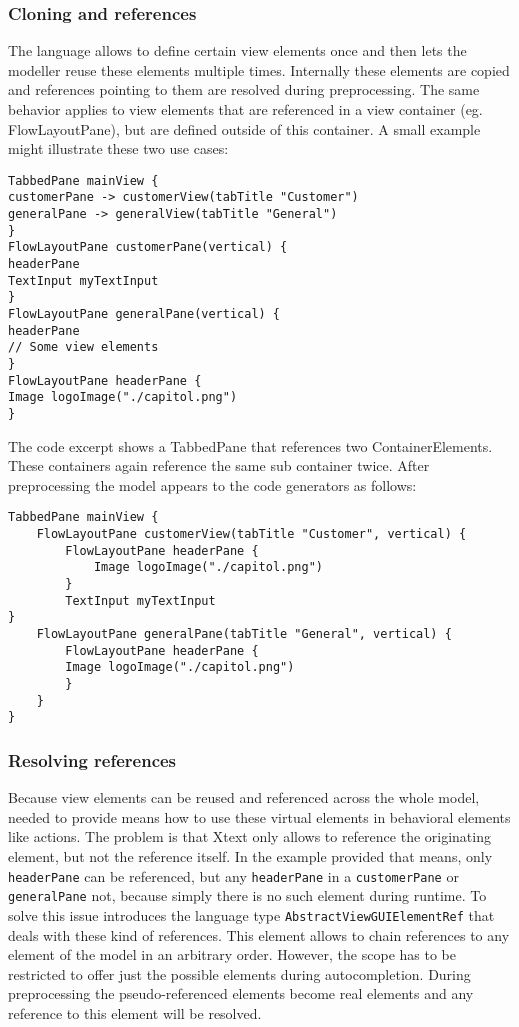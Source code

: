 \subsubsection{Cloning and references}
The \MD language allows to define certain view elements once and then lets the modeller reuse these elements multiple times. Internally these elements are copied and references pointing to them are resolved during preprocessing. The same behavior applies to view elements that are referenced in a view container (eg. FlowLayoutPane), but are defined outside of this container. A small example might illustrate these two use cases:

\begin{lstlisting}[language=MD2]
TabbedPane mainView {
customerPane -> customerView(tabTitle "Customer")
generalPane -> generalView(tabTitle "General")
}
FlowLayoutPane customerPane(vertical) {
headerPane
TextInput myTextInput
}
FlowLayoutPane generalPane(vertical) {
headerPane
// Some view elements
}
FlowLayoutPane headerPane {
Image logoImage("./capitol.png")
}
\end{lstlisting}

The code excerpt shows a TabbedPane that references two ContainerElements. These containers again reference the same sub container twice. After preprocessing the model appears to the code generators as follows:
\begin{lstlisting}[language=MD2]
TabbedPane mainView {
	FlowLayoutPane customerView(tabTitle "Customer", vertical) {
	    FlowLayoutPane headerPane {
	    	Image logoImage("./capitol.png")
	    }
		TextInput myTextInput
}
	FlowLayoutPane generalPane(tabTitle "General", vertical) {
		FlowLayoutPane headerPane {
		Image logoImage("./capitol.png")
		}
	}
}
\end{lstlisting}

\subsubsection{Resolving references}
Because view elements can be reused and referenced across the whole model, \MD needed to provide means how to use these virtual elements in behavioral elements like actions. The problem is that Xtext only allows to reference the originating element, but not the reference itself. In the example provided that means, only \lstinline!headerPane! can be referenced, but any \lstinline!headerPane! in a \lstinline!customerPane! or \lstinline!generalPane! not, because simply there is no such element during runtime. To solve this issue \MD introduces the language type \lstinline!AbstractViewGUIElementRef! that deals with these kind of references. This element allows to chain references to any element of the model in an arbitrary order. However, the scope has to be restricted to offer just the possible elements during autocompletion. During preprocessing the pseudo-referenced elements become real elements and any reference to this element will be resolved.

